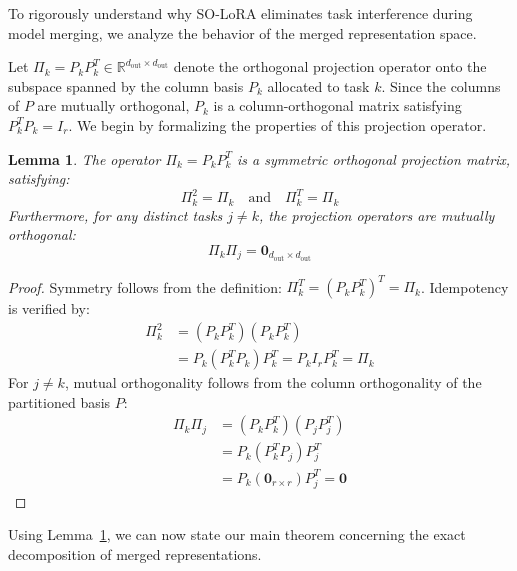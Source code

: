 \documentclass{article}
\theoremstyle{plain}
\newtheorem{lemma}[theorem]{Lemma}
\theoremstyle{definition}
\theoremstyle{remark}
\begin{document}
To rigorously understand why SO-LoRA eliminates task interference during model merging, we analyze the behavior of the merged representation space. 

Let $\Pi_k = P_k P_k^T \in \mathbb{R}^{d_{\text{out}} \times d_{\text{out}}}$ denote the orthogonal projection operator onto the subspace spanned by the column basis $P_k$ allocated to task $k$. Since the columns of $P$ are mutually orthogonal, $P_k$ is a column-orthogonal matrix satisfying $P_k^T P_k = I_r$. We begin by formalizing the properties of this projection operator.

\begin{lemma}
\label{lem:projection}
The operator $\Pi_k = P_k P_k^T$ is a symmetric orthogonal projection matrix, satisfying:
\begin{equation}
  \Pi_k^2 = \Pi_k \quad \text{and} \quad \Pi_k^T = \Pi_k
\end{equation}
Furthermore, for any distinct tasks $j \neq k$, the projection operators are mutually orthogonal:
\begin{equation}
  \Pi_k \Pi_j = \mathbf{0}_{d_{\text{out}} \times d_{\text{out}}}
\end{equation}
\end{lemma}

\begin{proof}
Symmetry follows from the definition: $\Pi_k^T = (P_k P_k^T)^T = \Pi_k$. Idempotency is verified by:
\begin{align}
  \Pi_k^2 &= (P_k P_k^T)(P_k P_k^T) \nonumber \\
  &= P_k (P_k^T P_k) P_k^T = P_k I_r P_k^T = \Pi_k
\end{align}
For $j \neq k$, mutual orthogonality follows from the column orthogonality of the partitioned basis $P$:
\begin{align}
  \Pi_k \Pi_j &= (P_k P_k^T)(P_j P_j^T) \nonumber \\
  &= P_k (P_k^T P_j) P_j^T \nonumber \\
  &= P_k (\mathbf{0}_{r \times r}) P_j^T = \mathbf{0}
\end{align}
\end{proof}

Using Lemma~\ref{lem:projection}, we can now state our main theorem concerning the exact decomposition of merged representations.
\end{document}
